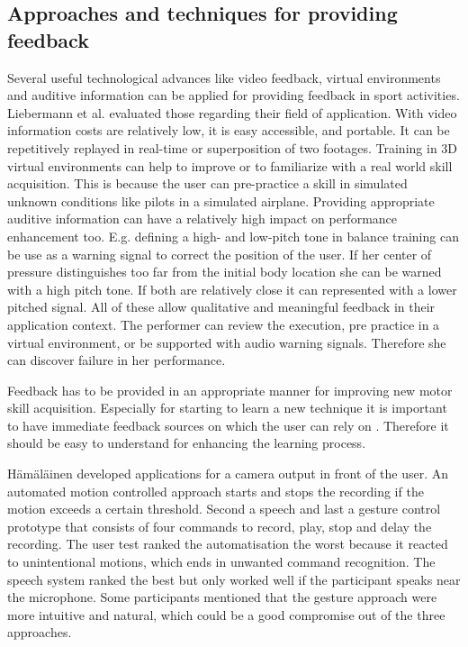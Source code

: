 \subsection{Approaches and techniques for providing feedback}

Several  useful technological advances like video feedback, virtual environments and auditive information can be applied for providing feedback in sport activities. Liebermann et al. \cite{Liebermann2002-zr} evaluated those regarding their field of application. With video information costs are relatively low, it is easy accessible, and portable. It can be repetitively replayed in real-time or superposition of two footages. Training in 3D virtual environments can help to improve or to familiarize with a real world skill acquisition. This is because the user can pre-practice a skill in simulated unknown conditions like pilots in a simulated airplane. Providing appropriate auditive information can have a relatively high impact on performance enhancement too. E.g. defining a high- and low-pitch tone in balance training can be use as a warning signal to correct the position of the user. If her center of pressure distinguishes too far from the initial body location she can be warned with a high pitch tone. If both are relatively close it can represented with a lower pitched signal. All of these allow qualitative and meaningful feedback in their application context. The performer can review the execution, pre practice in a virtual environment, or be supported with audio warning signals. Therefore she can discover failure in her performance.

Feedback has to be provided in an appropriate manner for improving new motor skill acquisition. Especially for starting to learn a new technique it is important to have immediate feedback sources on which the user can rely on \cite{Hodges2002-gb} \cite{Winstein1990-to}. Therefore it should be easy to understand for enhancing the learning process. 

Hämäläinen \cite{Hmlinen2004-ai} developed applications for a camera output in front of the user. An automated motion controlled approach starts and stops the recording if the motion exceeds a certain threshold. Second a speech and last a gesture control prototype that consists of four commands to record, play, stop and delay the recording. The user test ranked the automatisation the worst because it reacted to unintentional motions, which ends in unwanted command recognition. The speech system ranked the best but only worked well if the participant speaks near the microphone. Some participants mentioned that the gesture approach were more intuitive and natural, which could be a good compromise out of the three approaches.

